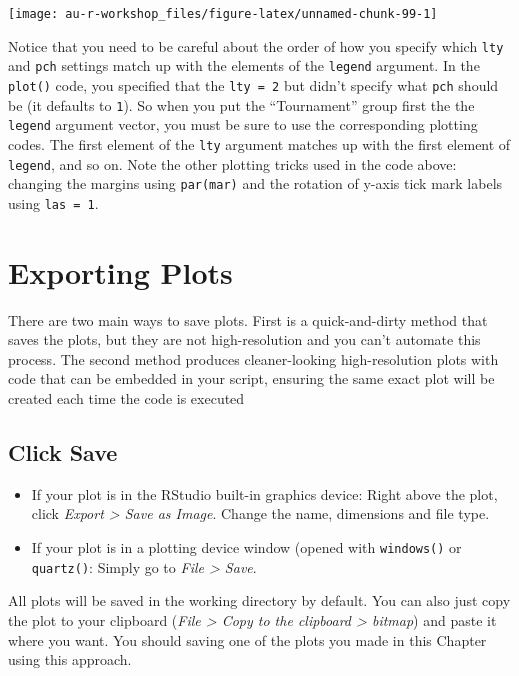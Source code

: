 \documentclass[]{book}
\providecommand{\tightlist}{%
  \setlength{\itemsep}{0pt}\setlength{\parskip}{0pt}}
\theoremstyle{definition}
\theoremstyle{definition}
\theoremstyle{definition}
\theoremstyle{remark}
\begin{document}
\begin{center}\texttt{[image: au-r-workshop\_files/figure-latex/unnamed-chunk-99-1]} \end{center}

Notice that you need to be careful about the order of how you specify
which \texttt{lty} and \texttt{pch} settings match up with the elements
of the \texttt{legend} argument. In the \texttt{plot()} code, you
specified that the \texttt{lty\ =\ 2} but didn't specify what
\texttt{pch} should be (it defaults to \texttt{1}). So when you put the
``Tournament'' group first the the \texttt{legend} argument vector, you
must be sure to use the corresponding plotting codes. The first element
of the \texttt{lty} argument matches up with the first element of
\texttt{legend}, and so on. Note the other plotting tricks used in the
code above: changing the margins using \texttt{par(mar)} and the
rotation of y-axis tick mark labels using \texttt{las\ =\ 1}.

\section{Exporting Plots}\label{exporting-plots}

There are two main ways to save plots. First is a quick-and-dirty method
that saves the plots, but they are not high-resolution and you can't
automate this process. The second method produces cleaner-looking
high-resolution plots with code that can be embedded in your script,
ensuring the same exact plot will be created each time the code is
executed

\subsection{Click Save}\label{click-save}

\begin{itemize}
\tightlist
\item
  If your plot is in the RStudio built-in graphics device: Right above
  the plot, click \emph{Export \textgreater{} Save as Image}. Change the
  name, dimensions and file type.
\item
  If your plot is in a plotting device window (opened with
  \texttt{windows()} or \texttt{quartz()}: Simply go to \emph{File
  \textgreater{} Save}.
\end{itemize}

All plots will be saved in the working directory by default. You can
also just copy the plot to your clipboard (\emph{File \textgreater{}
Copy to the clipboard \textgreater{} bitmap}) and paste it where you
want. You should saving one of the plots you made in this Chapter using
this approach.
\end{document}
